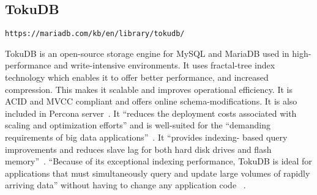 \subsection{TokuDB}

\verb|https://mariadb.com/kb/en/library/tokudb/|
 
TokuDB is an open-source storage engine for MySQL and MariaDB used in high-
performance and write-intensive environments. It uses fractal-tree index 
technology which enables it to offer better performance, and increased compression. 
This makes it scalable and improves operational efficiency. It is ACID and MVCC 
compliant and offers online schema-modifications. It is also included in Percona 
server~\cite{hid-sp18-516-wiki-tokudb}. It ``reduces the deployment costs associated with 
scaling and optimization efforts'' and is well-suited for the ``demanding requirements 
of big data applications''~\cite{hid-sp18-516-percona-tokudb}. It ``provides indexing-
based query improvements and reduces slave lag for both hard disk drives and flash 
memory''~\cite{hid-sp18-516-wiki-tokudb}. ``Because of its exceptional indexing performance, 
TokuDB is ideal for applications that must simultaneously query and update large 
volumes of rapidly arriving data'' without having to change any application code
~\cite{hid-sp18-516-blackbird-si}.

